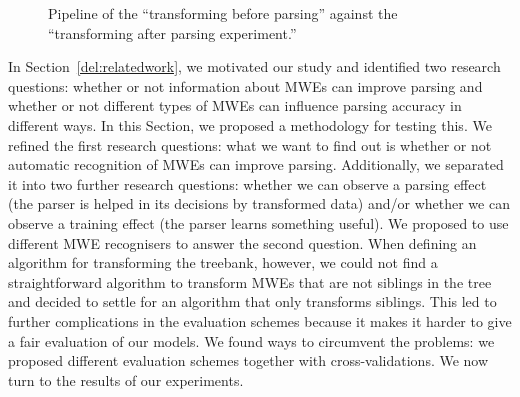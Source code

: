 \documentclass[output=paper]{langsci/langscibook}
\begin{document}
    \begin{figure}[t]
        \small
        \caption{Pipeline of the ``transforming before parsing'' against the ``transforming after parsing experiment.''\label{del:fig:pipel2}}
    \end{figure}

    \indent In Section~\ref{del:relatedwork}, we motivated our study and identified two research questions: whether or not information about MWEs can improve  parsing and whether or not different types of MWEs can influence parsing accuracy in different ways. In this Section, we proposed a methodology for testing this. We refined the first research questions: what we want to find out is whether or not automatic recognition of MWEs can improve  parsing. Additionally, we separated it into two further research questions: whether we can observe a parsing effect (the parser is helped in its decisions by transformed data) and/or whether we can observe a training effect (the parser learns something useful). We proposed to use different MWE recognisers to answer the second question. When defining an algorithm for transforming the treebank, however, we could not find a straightforward algorithm to transform MWEs that are not siblings in the tree and decided to settle for an algorithm that only transforms siblings. This led to further complications in the evaluation schemes because it makes it harder to give a fair evaluation of our models. We found ways to circumvent the problems: we proposed different evaluation schemes together with cross-validations. We now turn to the results of our experiments.
\end{document}
